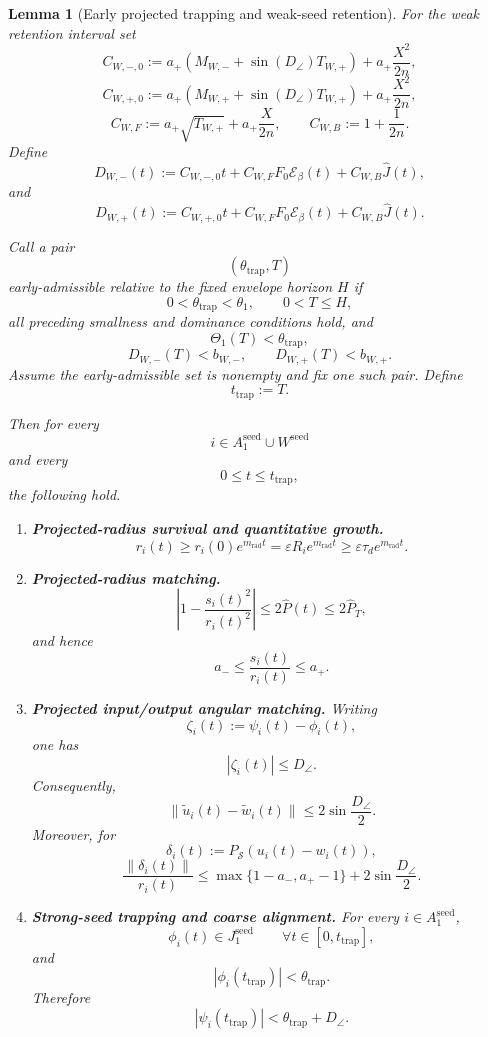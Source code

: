 \documentclass{article} %
\theoremstyle{plain}
\newtheorem{lemma}[theorem]{Lemma}
\theoremstyle{definition}
\theoremstyle{remark}
\begin{document}
\begin{lemma}[Early projected trapping and weak-seed retention]
For the weak retention interval set
\[
C_{W,-,0}
:=
a_+
\left(
M_{W,-}
+
\sin(D_\angle)T_{W,+}
\right)
+
a_+\frac{X^2}{2n},
\]
\[
C_{W,+,0}
:=
a_+
\left(
M_{W,+}
+
\sin(D_\angle)T_{W,+}
\right)
+
a_+\frac{X^2}{2n},
\]
\[
C_{W,F}
:=
a_+\sqrt{T_{W,+}}
+
a_+\frac{X}{2n},
\qquad
C_{W,B}:=1+\frac1{2n}.
\]
Define
\[
\boxed{
D_{W,-}(t)
:=
C_{W,-,0}t
+
C_{W,F}F_0\mathcal E_\beta(t)
+
C_{W,B}\widehat J(t),
}
\]
and
\[
\boxed{
D_{W,+}(t)
:=
C_{W,+,0}t
+
C_{W,F}F_0\mathcal E_\beta(t)
+
C_{W,B}\widehat J(t).
}
\]

Call a pair
\[
(\theta_{\mathrm{trap}},T)
\]
\emph{early-admissible relative to the fixed envelope horizon $H$} if
\[
\boxed{
0<\theta_{\mathrm{trap}}<\theta_1,
\qquad
0<T\le H,
}
\]
all preceding smallness and dominance conditions hold, and
\[
\boxed{
\Theta_1(T)<\theta_{\mathrm{trap}},
}
\]
\[
\boxed{
D_{W,-}(T)<b_{W,-},
\qquad
D_{W,+}(T)<b_{W,+}.
}
\]
Assume the early-admissible set is nonempty and fix one such pair.  Define
\[
\boxed{
t_{\mathrm{trap}}:=T.
}
\]

Then for every
\[
i\in A_1^{\mathrm{seed}}\cup W^{\mathrm{seed}}
\]
and every
\[
0\le t\le t_{\mathrm{trap}},
\]
the following hold.

\begin{enumerate}[label=\textnormal{(\roman*)},leftmargin=2.4em]

\item
\textbf{Projected-radius survival and quantitative growth.}
\[
\boxed{
r_i(t)
\ge
r_i(0)e^{m_{\mathrm{rad}}t}
=
\varepsilon R_i e^{m_{\mathrm{rad}}t}
\ge
\varepsilon\tau_d e^{m_{\mathrm{rad}}t}.
}
\]

\item
\textbf{Projected-radius matching.}
\[
\boxed{
\left|
1-\frac{s_i(t)^2}{r_i(t)^2}
\right|
\le
2\widehat P(t)
\le
2\widehat P_T,
}
\]
and hence
\[
\boxed{
a_-
\le
\frac{s_i(t)}{r_i(t)}
\le
a_+.
}
\]

\item
\textbf{Projected input/output angular matching.}
Writing
\[
\zeta_i(t):=\psi_i(t)-\phi_i(t),
\]
one has
\[
\boxed{
|\zeta_i(t)|
\le
D_\angle.
}
\]
Consequently,
\[
\boxed{
\|\widetilde u_i(t)-\widetilde w_i(t)\|
\le
2\sin\frac{D_\angle}{2}.
}
\]
Moreover, for
\[
\delta_i(t)
:=
P_{\mathcal S}(u_i(t)-w_i(t)),
\]
\[
\boxed{
\frac{\|\delta_i(t)\|}{r_i(t)}
\le
\max\{1-a_-,a_+-1\}
+
2\sin\frac{D_\angle}{2}.
}
\]

\item
\textbf{Strong-seed trapping and coarse alignment.}
For every $i\in A_1^{\mathrm{seed}}$,
\[
\boxed{
\phi_i(t)\in J_1^{\mathrm{seed}}
\qquad
\forall t\in[0,t_{\mathrm{trap}}],
}
\]
and
\[
\boxed{
|\phi_i(t_{\mathrm{trap}})|
<
\theta_{\mathrm{trap}}.
}
\]
Therefore
\[
\boxed{
|\psi_i(t_{\mathrm{trap}})|
<
\theta_{\mathrm{trap}}+D_\angle.
}
\]


\end{enumerate}
\end{lemma}
\end{document}
